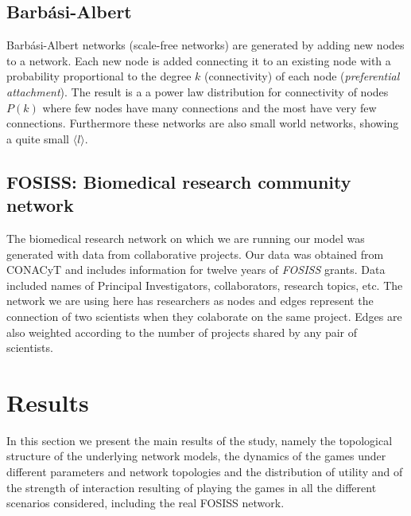 \documentclass{bmcart}
\begin{document}
\subsection*{Barb\'asi-Albert}

Barb\'asi-Albert networks \cite{BarabasiAlbert:99} (scale-free networks) are generated by adding new nodes to a network. Each new node is added connecting it to an existing node with a probability proportional to the degree $k$ (connectivity) of each node (\textit{preferential attachment}). The result is a a power law distribution for connectivity of nodes $P(k)$ where few nodes have many connections and the most have very few connections. Furthermore these networks are also small world networks, showing a quite small $\langle l \rangle$.


\subsection*{FOSISS: Biomedical research community network}

The biomedical research network on which we are running our model was generated 
with data from collaborative projects. Our data was obtained from CONACyT and includes information for twelve years of \textit{FOSISS} grants. Data included names of Principal Investigators, collaborators, research topics, etc. The network we are using here has researchers as nodes and edges represent the connection of two scientists when they colaborate on the same project. Edges are also weighted according to the number of projects shared by any pair of scientists.\\

\section*{Results}

In this section we present the main results of the study, namely the topological
structure of the underlying network models, the dynamics of the games under
different parameters and network topologies and the distribution of utility and
of the strength of interaction resulting of playing the games in all the
different scenarios considered, including the real FOSISS network.\\
\end{document}
